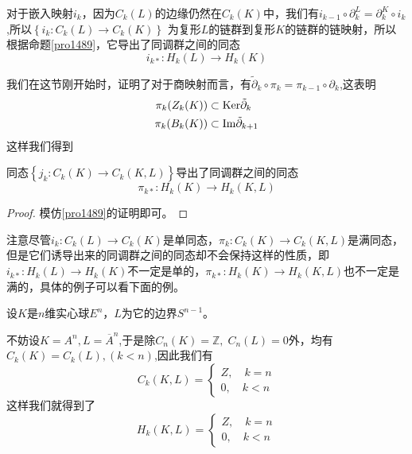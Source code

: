 对于嵌入映射$i_{k}$，因为$C_{k}(L)$的边缘仍然在$C_{k}(K)$中，我们有$i_{k-1}\circ \partial^{L}_{k}=\partial^{K}_{k}\circ i_{k}$,所以$\left\{i_{k}:C_{k}(L)\rightarrow C_{k}(K)\right\}$
为复形$L$的链群到复形$K$的链群的链映射，所以根据命题\eqref{pro1489}，它导出了同调群之间的同态
$$i_{k*}:H_{k}(L)\rightarrow H_{k}(K)$$

我们在这节刚开始时，证明了对于商映射而言，有$\tilde{\partial}_{k}\circ\pi_{k}=\pi_{k-1}\circ \partial_{k}$,这表明
\begin{equation}
    \begin{aligned}
    \pi_{k}(Z_{k}(K))&\subset {\rm Ker} \tilde{\partial}_{k}\\
    \pi_{k}(B_{k}(K))&\subset {\rm Im} \tilde{\partial}_{k+1}\\
    \end{aligned}
\end{equation}
这样我们得到
   \begin{proposition}
   同态$\left\{j_{k}:C_{k}(K)\rightarrow C_{k}(K,L)\right\}$导出了同调群之间的同态$$\pi_{k*}:H_{k}(K)\rightarrow H_{k}(K,L)$$
   \end{proposition} 
   \begin{proof}
   模仿\eqref{pro1489}的证明即可。
   \end{proof}
   \begin{remark}
   注意尽管$i_{k}:C_{k}(L)\rightarrow C_{k}(K)$是单同态，$\pi_{k}:C_{k}(K)\rightarrow C_{k}(K,L)$是满同态，但是它们诱导出来的同调群之间的同态却不会保持这样的性质，即$i_{k*}:H_{k}(L)\rightarrow H_{k}(K)$不一定是单的，$\pi_{k*}:H_{k}(K)\rightarrow H_{k}(K,L)$也不一定是满的，具体的例子可以看下面的例。
   \end{remark}
  \begin{example}\label{example128}
  设$K$是$n$维实心球$E^{n}$，$L$为它的边界$S^{n-1}$。
  
  不妨设$K=A^{n},L=\overline{A}^{n}$,于是除$C_{n}(K)=\mathbb{Z},\;C_{n}(L)=0$外，均有$C_{k}(K)=C_{k}(L),(k<n)$,因此我们有
  \begin{equation}
      C_{k}(K,L)=\left\{\begin{array}{cc}
           Z,\quad k=n  \\
           0,\quad k<n 
      \end{array}\right.
  \end{equation}
  这样我们就得到了
  \begin{equation}
      H_{k}(K,L)=\left\{\begin{array}{cc}
           Z,\quad k=n  \\
           0,\quad k<n 
      \end{array}\right.
  \end{equation}
  \end{example}
